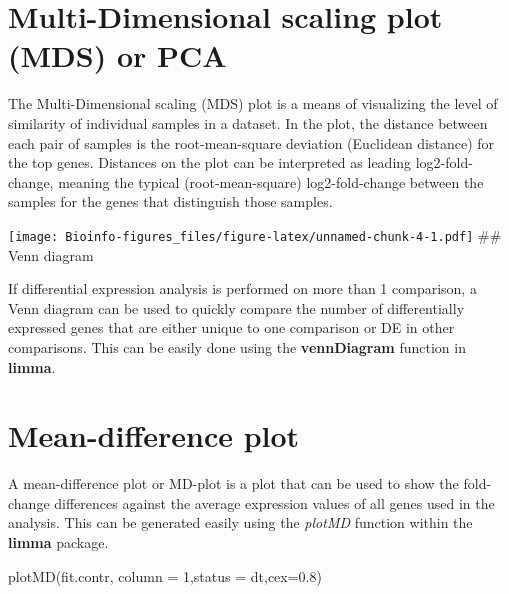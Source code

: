 \documentclass[
  openany]{book}
\newenvironment{Shaded}{\begin{snugshade}}{\end{snugshade}}
\newcommand{\AttributeTok}[1]{\textcolor[rgb]{0.77,0.63,0.00}{#1}}
\newcommand{\DecValTok}[1]{\textcolor[rgb]{0.00,0.00,0.81}{#1}}
\newcommand{\FloatTok}[1]{\textcolor[rgb]{0.00,0.00,0.81}{#1}}
\newcommand{\FunctionTok}[1]{\textcolor[rgb]{0.00,0.00,0.00}{#1}}
\newcommand{\NormalTok}[1]{#1}
\newcommand{\OtherTok}[1]{\textcolor[rgb]{0.56,0.35,0.01}{#1}}
\newcommand{\SpecialCharTok}[1]{\textcolor[rgb]{0.00,0.00,0.00}{#1}}
\newcommand{\StringTok}[1]{\textcolor[rgb]{0.31,0.60,0.02}{#1}}
\begin{document}
\hypertarget{multi-dimensional-scaling-plot-mds-or-pca}{%
\section{Multi-Dimensional scaling plot (MDS) or PCA}\label{multi-dimensional-scaling-plot-mds-or-pca}}

The Multi-Dimensional scaling (MDS) plot is a means of visualizing the level of similarity of individual samples in a dataset. In the plot, the distance between each pair of samples is the root-mean-square deviation (Euclidean distance) for the top genes. Distances on the plot can be interpreted as leading log2-fold-change, meaning the typical (root-mean-square) log2-fold-change between the samples for the genes that distinguish those samples.

\begin{Shaded}
\end{Shaded}

\texttt{[image: Bioinfo-figures\_files/figure-latex/unnamed-chunk-4-1.pdf]}
\#\# Venn diagram

If differential expression analysis is performed on more than 1 comparison, a Venn diagram can be used to quickly compare the number of differentially expressed genes that are either unique to one comparison or DE in other comparisons. This can be easily done using the \textbf{vennDiagram} function in \textbf{limma}.

\hypertarget{mean-difference-plot}{%
\section{Mean-difference plot}\label{mean-difference-plot}}

A mean-difference plot or MD-plot is a plot that can be used to show the fold-change differences against the average expression values of all genes used in the analysis. This can be generated easily using the \emph{plotMD} function within the \textbf{limma} package.

\begin{Shaded}
\begin{Highlighting}[]
\FunctionTok{plotMD}\NormalTok{(fit.contr, }\AttributeTok{column =} \DecValTok{1}\NormalTok{,}\AttributeTok{status =}\NormalTok{ dt,}\AttributeTok{cex=}\FloatTok{0.8}\NormalTok{)}
\end{Highlighting}
\end{Shaded}
\end{document}
